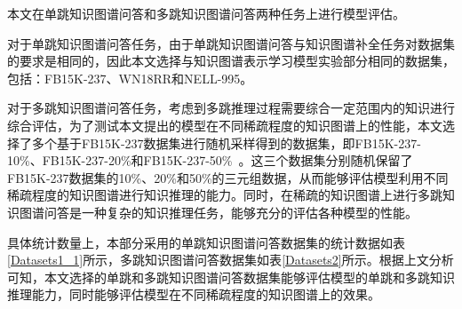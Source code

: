 \documentclass[algorithmlist, AutoFakeBold, AutoFakeSlant, figurelist, tablelist, nomlist, engineering, openany]{seuthesix} %
\begin{document}
本文在单跳知识图谱问答和多跳知识图谱问答两种任务上进行模型评估。

对于单跳知识图谱问答任务，由于单跳知识图谱问答与知识图谱补全任务对数据集的要求是相同的，因此本文选择与知识图谱表示学习模型实验部分相同的数据集，包括：FB15K-237、WN18RR和NELL-995。

对于多跳知识图谱问答任务，考虑到多跳推理过程需要综合一定范围内的知识进行综合评估，为了测试本文提出的模型在不同稀疏程度的知识图谱上的性能，本文选择了多个基于FB15K-237数据集进行随机采样得到的数据集，即FB15K-237-10\%、FB15K-237-20\%和FB15K-237-50\%~\cite{lv2020dynamic}。这三个数据集分别随机保留了FB15K-237数据集的10\%、20\%和50\%的三元组数据，从而能够评估模型利用不同稀疏程度的知识图谱进行知识推理的能力。同时，在稀疏的知识图谱上进行多跳知识图谱问答是一种复杂的知识推理任务，能够充分的评估各种模型的性能。

具体统计数量上，本部分采用的单跳知识图谱问答数据集的统计数据如表\ref{Datasets1_1}所示，多跳知识图谱问答数据集如表\ref{Datasets2}所示。根据上文分析可知，本文选择的单跳和多跳知识图谱问答数据集能够评估模型的单跳和多跳知识推理能力，同时能够评估模型在不同稀疏程度的知识图谱上的效果。
\end{document}
